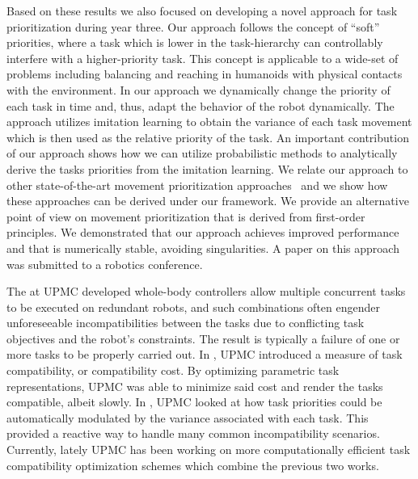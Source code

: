 Based on these results we also focused on developing a novel approach for task 
prioritization during year three. Our approach follows the concept of ``soft'' 
priorities, where a task which is lower in the task-hierarchy can controllably 
interfere with a higher-priority task. This concept is applicable to a wide-set 
of problems including balancing and reaching in humanoids with physical contacts 
with the environment. In our approach we dynamically change the priority of each 
task in time and, thus, adapt the behavior of the robot dynamically.  The 
approach utilizes imitation learning to obtain the variance of each task 
movement which is then used as the relative priority of the task. An important 
contribution of our approach shows how we can utilize probabilistic methods to 
analytically derive the tasks priorities from the imitation learning. We relate 
our approach to other state-of-the-art movement prioritization 
approaches~\cite{Peters_AR_2008, lober2015variance} and we show how these 
approaches can be derived under our framework. We provide an alternative point 
of view on movement prioritization that is derived from first-order principles. 
We demonstrated that our approach achieves improved performance and that is 
numerically stable, avoiding singularities. A paper on this approach was 
submitted to a robotics conference.

The at UPMC developed whole-body controllers allow multiple concurrent tasks to be 
executed on redundant robots, and such combinations often engender unforeseeable 
incompatibilities between the tasks due to conflicting task objectives and the 
robot's constraints. The result is typically a failure of one or more tasks to 
be properly carried out. In \cite{lober-HUMANOIDS2014}, UPMC introduced a measure of task 
compatibility, or compatibility cost. By optimizing parametric task 
representations, UPMC was able to minimize said cost and render the tasks 
compatible, albeit slowly. In \cite{lober2015variance}, UPMC looked at how task 
priorities could be automatically modulated by the variance associated with each 
task. This provided a reactive way to handle many common incompatibility 
scenarios. Currently, lately UPMC has been working on more computationally 
efficient task compatibility optimization schemes which combine the previous two 
works.   

